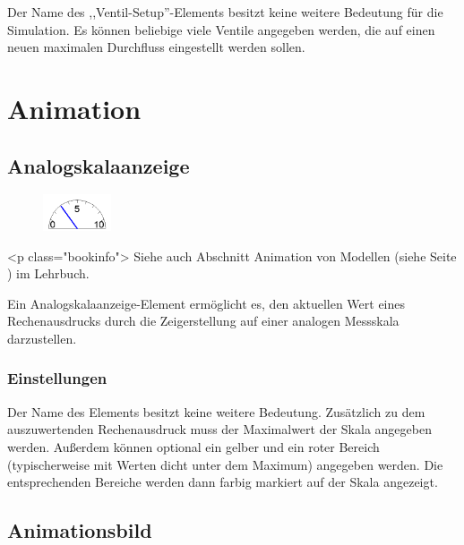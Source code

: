 Der Name des ,,Ventil-Setup''-Elements besitzt keine weitere Bedeutung für die Simulation.
Es können beliebige viele Ventile angegeben werden, die auf einen neuen maximalen Durchfluss
eingestellt werden sollen.





\chapter{Animation}

\section{Analogskalaanzeige}
\label{ref:ModelElementAnimationPointerMeasuring}

\begin{figure}
\vspace{-22pt}
\includegraphics[width=2cm]{imageModelElementAnimationPointerMeasuring.png}
\vspace{-22pt}
\end{figure}

<p class="bookinfo">
Siehe auch Abschnitt Animation von Modellen (siehe Seite \pageref{ref:book:5.4.3}) im Lehrbuch.

Ein Analogskalaanzeige-Element ermöglicht es, den aktuellen Wert eines Rechenausdrucks
durch die Zeigerstellung auf einer analogen Messskala darzustellen.

\subsection*{Einstellungen}

Der Name des Elements besitzt keine weitere Bedeutung.
Zusätzlich zu dem auszuwertenden Rechenausdruck muss
der Maximalwert der Skala angegeben werden. Außerdem können
optional ein gelber und ein roter Bereich (typischerweise
mit Werten dicht unter dem Maximum) angegeben werden. Die
entsprechenden Bereiche werden dann farbig markiert auf
der Skala angezeigt.


\section{Animationsbild}
\label{ref:ModelElementAnimationImage}

